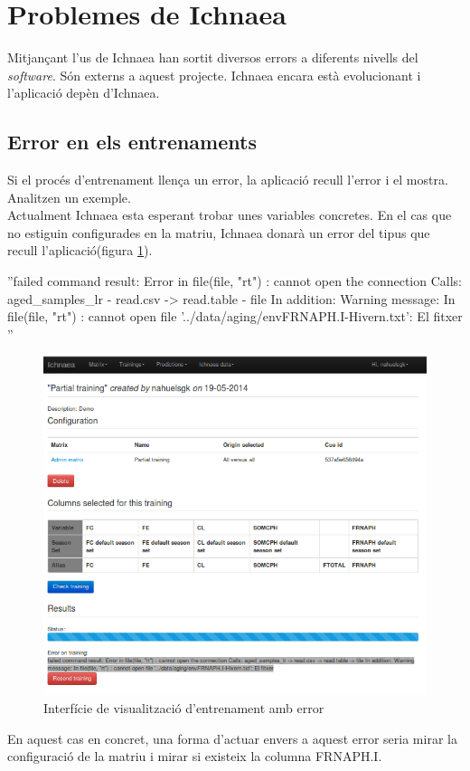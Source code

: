 \section{Problemes de Ichnaea}
\label{sec:ichnaeaErrors}
Mitjançant l'us de Ichnaea han sortit diversos errors a diferents nivells del \textit{software}. S\'{o}n externs a aquest projecte. Ichnaea encara est\`{a} evolucionant i l'aplicació depèn d'Ichnaea.

\subsection{Error en els entrenaments}
Si el proc\'{e}s d'entrenament llença un error, la aplicació recull l'error i el mostra. Analitzen un exemple.\\

Actualment Ichnaea esta esperant trobar unes variables concretes. En el cas que no estiguin configurades en la matriu, Ichnaea donar\`{a} un error del tipus que recull l'aplicació(figura \ref{fig:viewtrainingerror}).

\begin{center}
''failed command result: Error in file(file, "rt") : cannot open the connection Calls: aged\_samples\_lr - \> read.csv -> read.table -\> file In addition: Warning message: In file(file, "rt") : cannot open file '../data/aging/envFRNAPH.I-Hivern.txt': El fitxer ''
\end{center}

\begin{figure}[h!]
  \centering
  \includegraphics[scale=0.5]{img/userguide/error_training.png}
  \caption{Interfície de visualització d'entrenament amb error}
  \label{fig:viewtrainingerror}
\end{figure}
En aquest cas en concret, una forma d'actuar envers a aquest error seria mirar la configuració de la matriu i mirar si existeix la columna FRNAPH.I.
